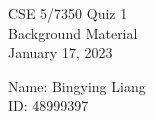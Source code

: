 \documentclass[12pt]{article}
\begin{document}
 
 
\renewcommand{\qedsymbol}{\filledbox}
\begin{center}
    CSE 5/7350 Quiz 1 \\
Background Material \\
January 17, 2023\\
\end{center}

\begin{flushright}
Name: Bingying Liang\\  %
ID: 48999397
\end{flushright}



\end{document}
